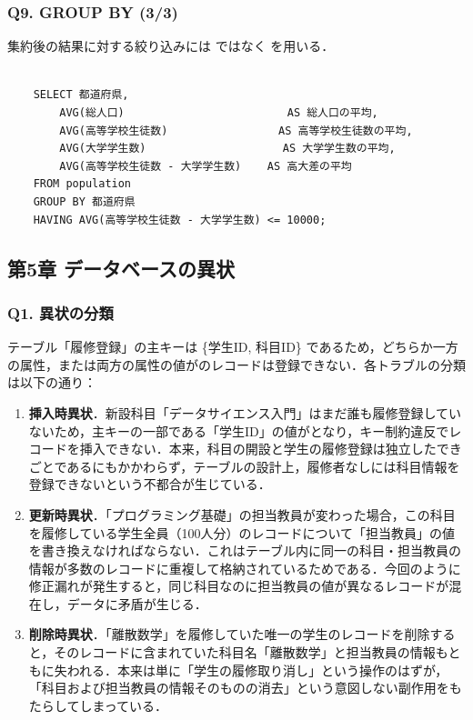 \subsubsection*{Q9. GROUP BY (3/3)}
集約後の結果に対する絞り込みには  ではなく  を用いる．
\begin{verbatim}

    SELECT 都道府県,
        AVG(総人口)                         AS 総人口の平均,
        AVG(高等学校生徒数)                 AS 高等学校生徒数の平均,
        AVG(大学学生数)                     AS 大学学生数の平均,
        AVG(高等学校生徒数 - 大学学生数)    AS 高大差の平均
    FROM population
    GROUP BY 都道府県
    HAVING AVG(高等学校生徒数 - 大学学生数) <= 10000;

\end{verbatim}


\subsection*{第5章 データベースの異状}

\subsubsection*{Q1. 異状の分類}
テーブル「履修登録」の主キーは \{学生ID, 科目ID\} であるため，どちらか一方の属性，または両方の属性の値がのレコードは登録できない．各トラブルの分類は以下の通り：
\begin{enumerate}
    \item \textbf{挿入時異状}．新設科目「データサイエンス入門」はまだ誰も履修登録していないため，主キーの一部である「学生ID」の値がとなり，キー制約違反でレコードを挿入できない．本来，科目の開設と学生の履修登録は独立したできごとであるにもかかわらず，テーブルの設計上，履修者なしには科目情報を登録できないという不都合が生じている．
    \item \textbf{更新時異状}．「プログラミング基礎」の担当教員が変わった場合，この科目を履修している学生全員（100人分）のレコードについて「担当教員」の値を書き換えなければならない．これはテーブル内に同一の科目・担当教員の情報が多数のレコードに重複して格納されているためである．今回のように修正漏れが発生すると，同じ科目なのに担当教員の値が異なるレコードが混在し，データに矛盾が生じる．
    \item \textbf{削除時異状}．「離散数学」を履修していた唯一の学生のレコードを削除すると，そのレコードに含まれていた科目名「離散数学」と担当教員の情報もともに失われる．本来は単に「学生の履修取り消し」という操作のはずが，「科目および担当教員の情報そのものの消去」という意図しない副作用をもたらしてしまっている．
\end{enumerate}

